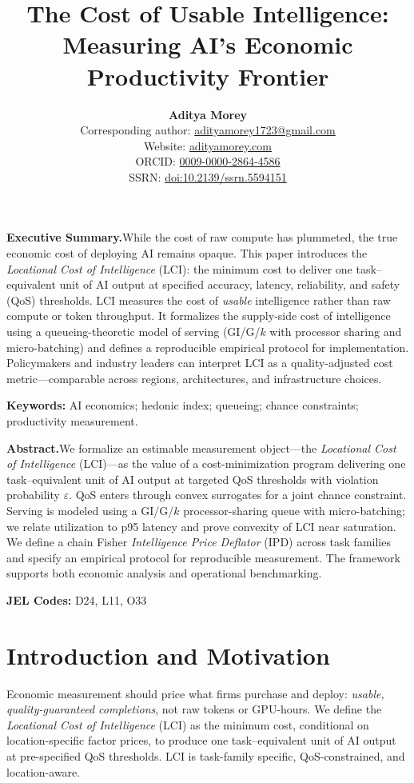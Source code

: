 \documentclass[12pt]{article}
\title{The Cost of Usable Intelligence: Measuring AI’s Economic Productivity Frontier}
\author{\textbf{Aditya Morey}\\
\small Corresponding author: \href{mailto:adityamorey1723@gmail.com}{adityamorey1723@gmail.com}\\
\small Website: \href{https://www.adityamorey.com}{adityamorey.com}\\
\small ORCID: \href{https://orcid.org/0009-0000-2864-4586}{0009-0000-2864-4586}\\
\small SSRN: \href{https://doi.org/10.2139/ssrn.5594151}{doi:10.2139/ssrn.5594151}}
\date{}
\numberwithin{equation}{section}
\theoremstyle{definition}
\theoremstyle{plain}
\begin{document}
\maketitle
\thispagestyle{plain}

\noindent\textbf{Executive Summary.}\;\;While the cost of raw compute has plummeted, the true economic cost of deploying AI remains opaque. This paper introduces the \emph{Locational Cost of Intelligence} (LCI): the minimum cost to deliver one task–equivalent unit of AI output at specified accuracy, latency, reliability, and safety (QoS) thresholds. LCI measures the cost of \emph{usable} intelligence rather than raw compute or token throughput. It formalizes the supply-side cost of intelligence using a queueing-theoretic model of serving (GI/G/$k$ with processor sharing and micro-batching) and defines a reproducible empirical protocol for implementation. Policymakers and industry leaders can interpret LCI as a quality-adjusted cost metric—comparable across regions, architectures, and infrastructure choices.

\vspace{0.6em}
\noindent\textbf{Keywords:} AI economics; hedonic index; queueing; chance constraints; productivity measurement.

\newpage

\noindent\textbf{Abstract.}\;\;We formalize an estimable measurement object—the \emph{Locational Cost of Intelligence} (LCI)—as the value of a cost-minimization program delivering one task–equivalent unit of AI output at targeted QoS thresholds with violation probability $\varepsilon$. QoS enters through convex surrogates for a joint chance constraint. Serving is modeled using a GI/G/$k$ processor-sharing queue with micro-batching; we relate utilization to p95 latency and prove convexity of LCI near saturation. We define a chain Fisher \emph{Intelligence Price Deflator} (IPD) across task families and specify an empirical protocol for reproducible measurement. The framework supports both economic analysis and operational benchmarking.

\vspace{0.3cm}
\noindent\textbf{JEL Codes:} D24, L11, O33

\newpage

\section{Introduction and Motivation}
Economic measurement should price what firms purchase and deploy: \emph{usable, quality-guaranteed completions}, not raw tokens or GPU-hours. We define the \emph{Locational Cost of Intelligence} (LCI) as the minimum cost, conditional on location-specific factor prices, to produce one task–equivalent unit of AI output at pre-specified QoS thresholds. LCI is task-family specific, QoS-constrained, and location-aware.
\end{document}
